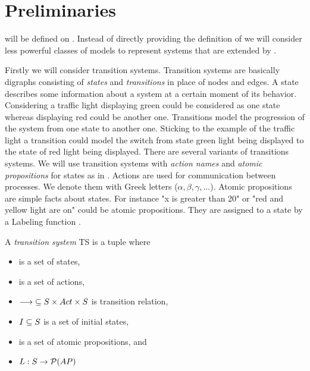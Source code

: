 \documentclass[preview]{standalone}
\begin{document}
\section{Preliminaries} \label{ch:prelim}

\viewsNC will be defined on \chgphsN. Instead of directly providing the definition of \chgphN we will consider less powerful classes of models to represent systems that are extended by \chgphsN.

Firstly we will consider transition systems. Transition systems are basically digraphs consisting of \emph{states} and \emph{transitions} in place of nodes and edges. A state describes some information about a system at a certain moment of its behavior. Considering a traffic light displaying green could be considered as one state whereas displaying red could be another one. Transitions model the progression of the system from one state to another one. Sticking to the example of the traffic light a transition could model the switch from state green light being displayed to the state of red light being displayed. There are several variants of transitions systems. We will use transition systems with \emph{action names} and \emph{atomic propositions} for states as in . Actions are used for communication between processes. We denote them with Greek letters ($\alpha, \beta, \gamma, \dots$). Atomic propositions are simple facts about states. For instance "x is greater than 20" or "red and yellow light are on" could be atomic propositions. They are assigned to a state by a Labeling function .


\begin{definition}
	A \emph{transition system} TS is a tuple \transitionsystem where
	\begin{itemize}
		\item \states is a set of states,
		\item \actions is a set of actions,
		\item ${\longrightarrow} \subseteq {S} \times {Act} \times {S}$ is transition relation,
		\item ${I} \subseteq {S}$ is a set of initial states,
		\item \atomicprops is a set of atomic propositions, and
		\item ${L} : {S} \to {\mathcal{P}(\ensuremath{{AP}})}$
	\end{itemize}
\end{definition}
\end{document}
